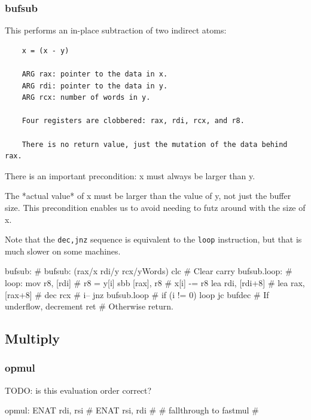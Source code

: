 \subsubsection{bufsub}

This performs an in-place subtraction of two indirect atoms:

\begin{verbatim}
    x = (x - y)

    ARG rax: pointer to the data in x.
    ARG rdi: pointer to the data in y.
    ARG rcx: number of words in y.

    Four registers are clobbered: rax, rdi, rcx, and r8.

    There is no return value, just the mutation of the data behind rax.
\end{verbatim}

There is an important precondition: x must always be larger than y.

The *actual value* of x must be larger than the value of y, not just
the buffer size.  This precondition enables us to avoid needing to futz
around with the size of x.

Note that the \lstinline|dec,jnz| sequence is equivalent to the
\lstinline|loop| instruction, but that is much slower on some machines.

\begin{asm}
bufsub:                                     # bufsub: (rax/x rdi/y rcx/yWords)
	clc                                 #   Clear carry
bufsub.loop:                                # loop:
	mov	r8, [rdi]                   #   r8 = y[i]
	sbb	[rax], r8                   #   x[i] -= r8
	lea	rdi, [rdi+8]                #
	lea	rax, [rax+8]                #
	dec	rcx                         #   i--
	jnz	bufsub.loop                 #   if (i != 0) loop
	jc	bufdec                      #   If underflow, decrement
	ret                                 #   Otherwise return.
\end{asm}

\subsection{Multiply}

\subsubsection{opmul}

TODO: is this evaluation order correct?

\begin{asm}
opmul:
	ENAT	rdi, rsi                    #
	ENAT	rsi, rdi                    #
	# fallthrough to fastmul            #
\end{asm}

